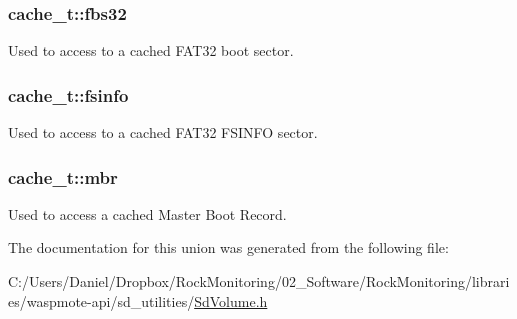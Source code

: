 \subsubsection[{\texorpdfstring{fbs32}{fbs32}}]{ cache\+\_\+t\+::fbs32}\hypertarget{unioncache__t_ad0613173ed4e83920eedfeb33102848a}{}\label{unioncache__t_ad0613173ed4e83920eedfeb33102848a}
Used to access to a cached F\+A\+T32 boot sector. 
\subsubsection[{\texorpdfstring{fsinfo}{fsinfo}}]{ cache\+\_\+t\+::fsinfo}\hypertarget{unioncache__t_a46c7b14586a6248824a97101111cbae1}{}\label{unioncache__t_a46c7b14586a6248824a97101111cbae1}
Used to access to a cached F\+A\+T32 F\+S\+I\+N\+FO sector. 
\subsubsection[{\texorpdfstring{mbr}{mbr}}]{ cache\+\_\+t\+::mbr}\hypertarget{unioncache__t_a6ac10bfb1ebb1139c448456679663bb6}{}\label{unioncache__t_a6ac10bfb1ebb1139c448456679663bb6}
Used to access a cached Master Boot Record. 

The documentation for this union was generated from the following file\+:\begin{DoxyCompactItemize}
\item 
C\+:/\+Users/\+Daniel/\+Dropbox/\+Rock\+Monitoring/02\+\_\+\+Software/\+Rock\+Monitoring/libraries/waspmote-\/api/sd\+\_\+utilities/\hyperlink{_sd_volume_8h}{Sd\+Volume.\+h}\end{DoxyCompactItemize}
